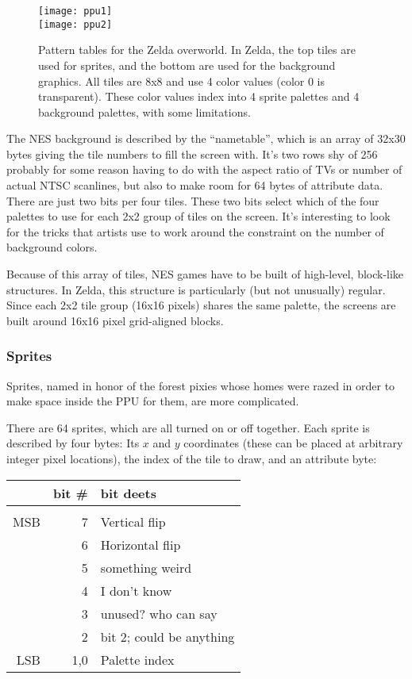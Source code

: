 \documentclass[twocolumn]{article}
\begin{document}
\begin{figure}[ht]
\begin{center}
\texttt{[image: ppu1]} \\
\vspace{1em}
\texttt{[image: ppu2]}
\end{center}\vspace{-0.1in}
\caption{Pattern tables for the Zelda overworld. In Zelda, the top tiles
are used for sprites, and the bottom are used for the background graphics.
All tiles are 8x8 and use 4 color values (color 0 is transparent). These
color values index into 4 sprite palettes and 4 background palettes, with
some limitations.
} \label{fig:ppu}
\end{figure}

The NES background is described by the ``nametable'', which is an
array of 32x30 bytes giving the tile numbers to fill the screen with.
It's two rows shy of 256 probably for some reason having to do with
the aspect ratio of TVs or number of actual NTSC scanlines, but also
to make room for 64 bytes of attribute data. There are just two bits
per four tiles. These two bits select which of the four palettes to
use for each 2x2 group of tiles on the screen. It's interesting to
look for the tricks that artists use to work around the constraint on
the number of background colors. %

Because of this array of tiles, NES games have to be built of
high-level, block-like structures. In Zelda, this structure is
particularly (but not unusually) regular. Since each 2x2 tile group
(16x16 pixels) shares the same palette, the screens are built around
16x16 pixel grid-aligned blocks.

\subsubsection{Sprites}

Sprites, named in honor of the forest pixies whose homes were razed in
order to make space inside the PPU for them, are more complicated.

There are 64 sprites, which are all turned on or off together. Each
sprite is described by four bytes: Its $x$ and $y$ coordinates (these
can be placed at arbitrary integer pixel locations), the index of
the tile to draw, and an attribute byte:

\begin{tabular}{rrl}
    & bit \# & bit deets \\
\hline \\
MSB & 7      & Vertical flip \\
    & 6      & Horizontal flip \\
    & 5      & something weird \\
    & 4      & I don't know \\
    & 3      & unused? who can say \\
    & 2      & bit 2; could be anything \\
LSB & 1,0    & Palette index \\
\end{tabular}
\end{document}
